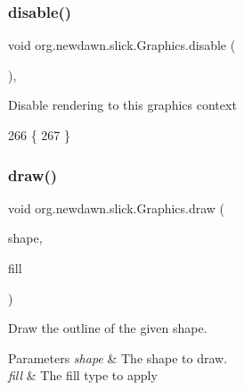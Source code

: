 \subsubsection{\texorpdfstring{disable()}{disable()}}
{\footnotesize\ttfamily void org.\+newdawn.\+slick.\+Graphics.\+disable (\begin{DoxyParamCaption}{ }\end{DoxyParamCaption})\hspace{0.3cm}{\ttfamily [inline]}, {\ttfamily [protected]}}

Disable rendering to this graphics context 
\begin{DoxyCode}
266                              \{
267     \}
\end{DoxyCode}
\mbox{\label{classorg_1_1newdawn_1_1slick_1_1_graphics_aa45e5bb37cfea7d888b338180b0d5bd4}} 
\subsubsection{\texorpdfstring{draw()}{draw()}\hspace{0.1cm}{\footnotesize\ttfamily [1/2]}}
{\footnotesize\ttfamily void org.\+newdawn.\+slick.\+Graphics.\+draw (\begin{DoxyParamCaption}\item[{\mbox{\hyperlink{classorg_1_1newdawn_1_1slick_1_1geom_1_1_shape}{Shape}}}]{shape,  }\item[{\mbox{\hyperlink{interfaceorg_1_1newdawn_1_1slick_1_1_shape_fill}{Shape\+Fill}}}]{fill }\end{DoxyParamCaption})\hspace{0.3cm}{\ttfamily [inline]}}

Draw the outline of the given shape.


\begin{DoxyParams}{Parameters}
{\em shape} & The shape to draw. \\
\hline
{\em fill} & The fill type to apply \\
\hline
\end{DoxyParams}

